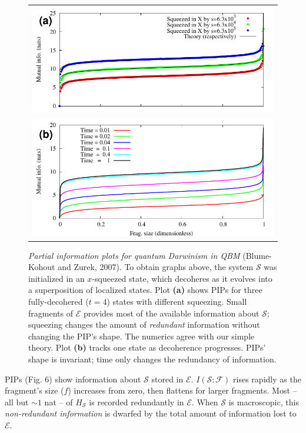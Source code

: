 \documentclass[aps,rmp,epsfig,11pt]{revtex4}
\newcommand{\Sys}{\ensuremath{\mathcal{S}}}
\newcommand{\Env}{\ensuremath{\mathcal{E}}}
\newcommand{\Hh}{\ensuremath{H}}
\newcommand{\Hs}{\ensuremath{\Hh_{\Sys}}}
\def\FCW{0.98\columnwidth}
\newcommand{\cS}        {{\mathcal S}}
\newcommand{\cE}        {{\mathcal E}}
\newcommand{\+}         {\dagger}
\newcommand\cF{{\mathcal F}}
\begin{document}
{\begin{figure}[tb]
\begin{tabular}{l}
\vspace{-0.15in} \includegraphics[width=\FCW]{PIP1.pdf}\\
\includegraphics[width=\FCW]{PIP2.pdf}\\
\end{tabular}
\caption{\emph{Partial information plots for quantum Darwinism in QBM} (Blume-Kohout and Zurek, 2007). To obtain graphs above, the system $\Sys$ was initialized in an $x$-squeezed state, which decoheres as it evolves into a superposition of localized states.  Plot \textbf{(a)} shows PIPs for three fully-decohered ($t=4$) states with different squeezing.  Small fragments of $\Env$ provides most of the available information about $\Sys$; squeezing changes the amount of \emph{redundant} information without changing the PIP's shape.  The numerics agree with our simple theory.  Plot \textbf{(b)} tracks one state as decoherence progresses.  PIPs' shape is invariant; time only changes the redundancy of information.}
\label{figPIPs}
\end{figure}

PIPs (Fig. 6) show information about $\Sys$ stored in $\Env$.
$I(\cS :\cF )$ rises rapidly as the fragment's size ($f$) increases from zero,
then flattens for larger fragments.  
Most -- all but $\sim1$ nat -- of $\Hs$ is recorded redundantly in $\cE$.
When $\Sys$ is macroscopic, this \emph{non-redundant information}
is dwarfed by the total amount of information lost to $\Env$.

}
\end{document}
